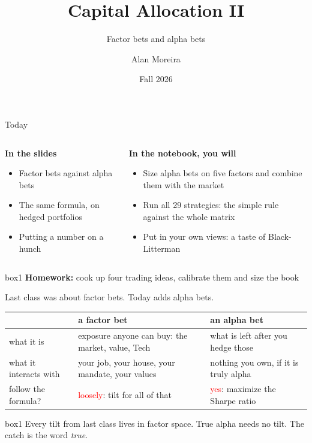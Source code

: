 \documentclass[aspectratio=169,10pt]{beamer}
\title{Capital Allocation II}
\subtitle{Factor bets and alpha bets}
\author[A. Moreira]{Alan Moreira}
\institute[Data-Driven Investing]{NYU Stern --- Data-Driven Investing}
\date{Fall 2026}
\begin{document}
\begin{frame}
\titlepage
\end{frame}

\begin{frame}{Today}
\vskip 6pt
\begin{columns}[t]
\begin{column}{0.46\textwidth}
\textbf{In the slides}
\vskip 6pt
\begin{itemize}
\item Factor bets against alpha bets
\vskip 6pt
\item The same formula, on hedged portfolios
\vskip 6pt
\item Putting a number on a hunch
\end{itemize}
\end{column}
\begin{column}{0.50\textwidth}
\textbf{In the notebook, you will}
\vskip 6pt
\begin{itemize}
\item Size alpha bets on five factors and combine them with the market
\vskip 6pt
\item Run all 29 strategies: the simple rule against the whole matrix
\vskip 6pt
\item Put in your own views: a taste of Black-Litterman
\end{itemize}
\end{column}
\end{columns}
\vskip 16pt
\begin{beamercolorbox}[rounded=true,sep=7pt,center]{box1}
\textbf{Homework:} cook up four trading ideas, calibrate them and size the book
\end{beamercolorbox}
\end{frame}

\begin{frame}{Last class was about factor bets. Today adds alpha bets.}
\vskip 6pt
\begin{center}
\renewcommand{\arraystretch}{1.6}
\begin{tabular}{P{2.9cm}P{4.9cm}P{4.9cm}}
\toprule
 & \textbf{a factor bet} & \textbf{an alpha bet} \\
\midrule
what it is & exposure anyone can buy: the market, value, Tech & what is left after you hedge those \\
what it interacts with & your job, your house, your mandate, your values & nothing you own, if it is truly alpha \\
follow the formula? & \textcolor{red}{loosely}: tilt for all of that & \textcolor{red}{yes}: maximize the Sharpe ratio \\
\bottomrule
\end{tabular}
\end{center}
\vskip 14pt
\begin{beamercolorbox}[rounded=true,sep=7pt,center]{box1}
Every tilt from last class lives in factor space. True alpha needs no tilt. The catch is the word \emph{true}.
\end{beamercolorbox}
\end{frame}
\end{document}
